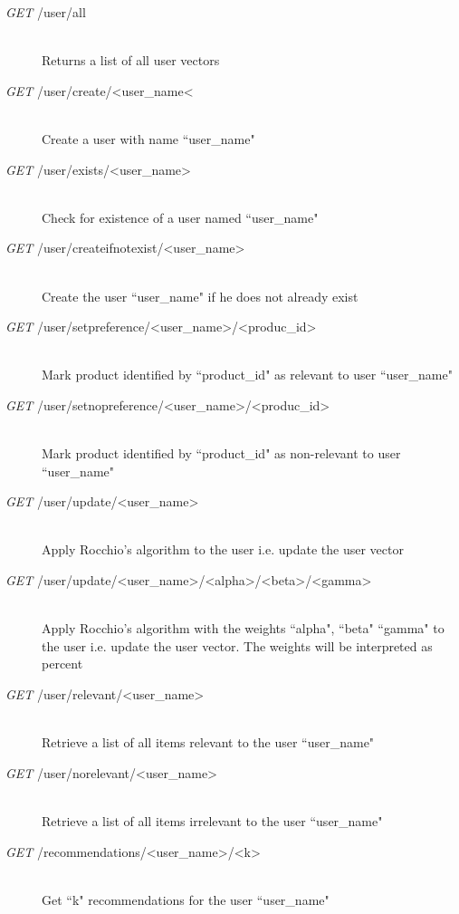 \begin{description}
    \item[\textit{GET} /user/all]\hfill\\
        Returns a list of all user vectors
    \item[\textit{GET} /user/create/\textless user\_name\textless]\hfill\\
        Create a user with name ``user\_name"
    \item[\textit{GET} /user/exists/\textless user\_name\textgreater]\hfill\\
        Check for existence of a user named ``user\_name"
    \item[\textit{GET} /user/createifnotexist/\textless user\_name\textgreater]\hfill\\
        Create the user ``user\_name" if he does not already exist
    \item[\textit{GET} /user/setpreference/\textless user\_name\textgreater /\textless produc\_id\textgreater]\hfill\\
        Mark product identified by ``product\_id" as relevant to user ``user\_name"
    \item[\textit{GET} /user/setnopreference/\textless user\_name\textgreater /\textless produc\_id\textgreater]\hfill\\
        Mark product identified by ``product\_id" as non-relevant to user ``user\_name"
    \item[\textit{GET} /user/update/\textless user\_name\textgreater]\hfill\\
        Apply Rocchio's algorithm to the user i.e. update the user vector
    \item[\textit{GET} /user/update/\textless user\_name\textgreater /\textless alpha\textgreater /\textless beta\textgreater /\textless gamma\textgreater]\hfill\\
        Apply Rocchio's algorithm with the weights ``alpha", ``beta" ``gamma" to the user i.e. update the user vector.
        The weights will be interpreted as percent
    \item[\textit{GET} /user/relevant/\textless user\_name\textgreater]\hfill\\
        Retrieve a list of all items relevant to the user ``user\_name"
    \item[\textit{GET} /user/norelevant/\textless user\_name\textgreater]\hfill\\
        Retrieve a list of all items irrelevant to the user ``user\_name"
    \item[\textit{GET} /recommendations/\textless user\_name\textgreater /\textless k\textgreater]\hfill\\
        Get ``k" recommendations for the user ``user\_name"
\end{description}
